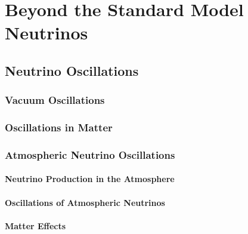 \setchapterpreamble[u]{\margintoc}

\chapter{Beyond the Standard Model Neutrinos}


\section{Neutrino Oscillations}

\subsection{Vacuum Oscillations}

\subsection{Oscillations in Matter}


\subsection{Atmospheric Neutrino Oscillations}

\subsubsection{Neutrino Production in the Atmosphere}

\subsubsection{Oscillations of Atmospheric Neutrinos}

\subsubsection{Matter Effects}



